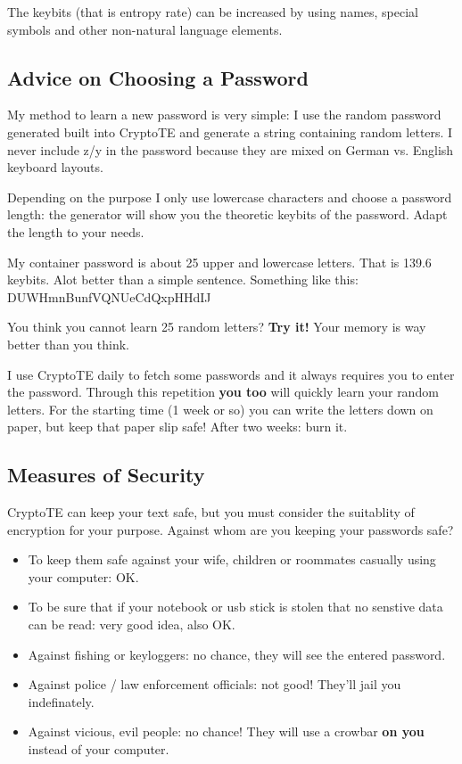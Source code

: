 \documentclass[a4paper,12pt,twoside]{article}
\begin{document}
The keybits (that is entropy rate) can be increased by using names, special symbols and other non-natural language elements.

\subsection{Advice on Choosing a Password}\label{AdvicePassword}

My method to learn a new password is very simple: I use the random password generated built into CryptoTE and generate a string containing random letters. I never include z/y in the password because they are mixed on German vs. English keyboard layouts.

Depending on the purpose I only use lowercase characters and choose a password length: the generator will show you the theoretic keybits of the password. Adapt the length to your needs.

My container password is about 25 upper and lowercase letters. That is 139.6 keybits. Alot better than a simple sentence. Something like this: DUWHmnBunfVQNUeCdQxpHHdIJ

You think you cannot learn 25 random letters? \textbf{Try it!} Your memory is way better than you think.

I use CryptoTE daily to fetch some passwords and it always requires you to enter the password. Through this repetition \textbf{you too} will quickly learn your random letters. For the starting time (1 week or so) you can write the letters down on paper, but keep that paper slip safe! After two weeks: burn it.

\subsection{Measures of Security}\label{MeasuresSecurity}

CryptoTE can keep your text safe, but you must consider the suitablity of encryption for your purpose. Against whom are you keeping your passwords safe?

\begin{itemize}
  \item To keep them safe against your wife, children or roommates casually using your computer: OK.
  \item To be sure that if your notebook or usb stick is stolen that no senstive data can be read: very good idea, also OK.
  \item Against fishing or keyloggers: no chance, they will see the entered password.
  \item Against police / law enforcement officials: not good! They'll jail you indefinately.
  \item Against vicious, evil people: no chance! They will use a crowbar \textbf{on you} instead of your computer.
\end{itemize}
\end{document}
